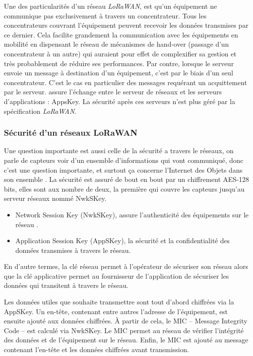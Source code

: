 \documentclass[11pt]{article}
\begin{document}
Une des particularités d’un réseau  \textit{LoRaWAN}, est qu’un équipement ne communique pas exclusivement à travers un concentrateur. Tous les concentrateurs couvrant l’équipement peuvent recevoir les données transmises par ce dernier.
Cela facilite grandement la communication avec les équipements en mobilité en dispensant le réseau de mécanismes de hand-over (passage d’un concentrateur à un autre) qui auraient pour effet de complexifier sa gestion et très probablement de réduire ses performances. Par contre, lorsque le serveur envoie un message à destination d’un équipement, c’est par le biais d’un seul concentrateur. C’est le cas en particulier des messages requérant un acquittement par le serveur.
 assure l'échange entre le serveur de réseaux et les serveurs d'applications : AppsKey. La sécurité après ces serveurs n'est plus géré par la spécification  \textit{LoRaWAN}.
 

\subsubsection{Sécurité d'un réseaux LoRaWAN}
Une question importante est aussi celle de la sécurité a travers le réseaux, on parle de capteurs voir d'un ensemble d'informations qui vont communiqué, donc c'est une question importante, et surtout ça concerne l'Internet des Objets dans son ensemble .
La sécurité est assuré de bout en bout par un chiffrement AES-128 bits, elles sont aux nombre de deux, la première qui couvre les capteurs jusqu'au serveur réseaux nommé NwkSKey.
\begin{itemize}
\item Network Session Key (NwkSKey), assure l’authenticité des équipements sur le réseau .
\item Application Session Key (AppSKey), la sécurité et la confidentialité des données transmises à travers le réseau.
\end{itemize}

En d’autre termes, la clé réseau permet à l’opérateur de sécuriser son réseau alors que la clé applicative permet au fournisseur de l’application de sécuriser les données qui transitent à travers le réseau.

Les données utiles que souhaite transmettre sont tout d’abord chiffrées via la AppSKey. Un en-tête, contenant entre autres l’adresse de l’équipement, est ensuite ajouté aux données chiffrées. À partir de cela, le MIC – Message Integrity Code – est calculé via NwkSKey. Le MIC permet au réseau de vérifier l’intégrité des données et de l’équipement sur le réseau. Enfin, le MIC est ajouté au message contenant l’en-tête et les données chiffrées avant transmission.
\end{document}
